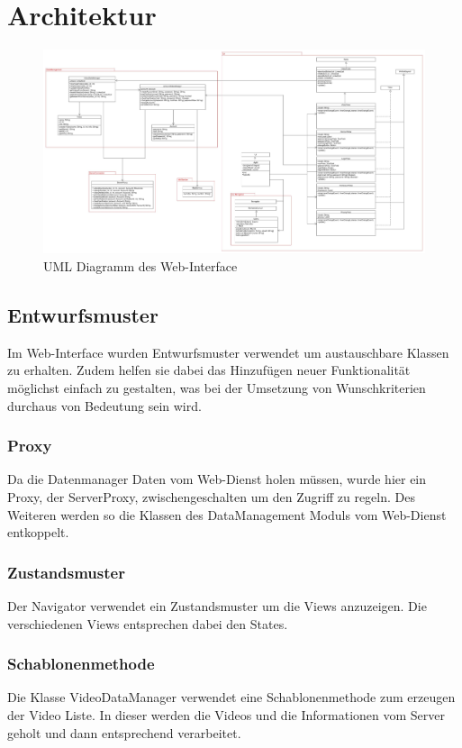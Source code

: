 \section{Architektur}
\begin{figure}[ht]
	\centering
\includegraphics[width=1\textwidth]{./resources/Diagramme/WebInterface/UMLWebInterface.jpg}
\caption{UML Diagramm des Web-Interface}
	\label{interface:fig:modules_overview}
\end{figure}

\subsection{Entwurfsmuster}
Im Web-Interface wurden Entwurfsmuster verwendet um austauschbare Klassen zu erhalten. Zudem helfen sie dabei das Hinzufügen neuer Funktionalität möglichst einfach zu gestalten, was bei der Umsetzung von Wunschkriterien durchaus von Bedeutung sein wird.

\subsubsection{Proxy}
Da die Datenmanager Daten vom Web-Dienst holen müssen, wurde hier ein Proxy, der ServerProxy, zwischengeschalten um den Zugriff zu regeln. Des Weiteren werden so die Klassen des DataManagement Moduls vom Web-Dienst entkoppelt.

\subsubsection{Zustandsmuster}
Der Navigator verwendet ein Zustandsmuster um die Views anzuzeigen. Die verschiedenen Views entsprechen dabei den States.

\subsubsection{Schablonenmethode}
Die Klasse VideoDataManager verwendet eine Schablonenmethode zum erzeugen der Video Liste. In dieser werden die Videos und die Informationen vom Server geholt und dann entsprechend verarbeitet.
\newpage
